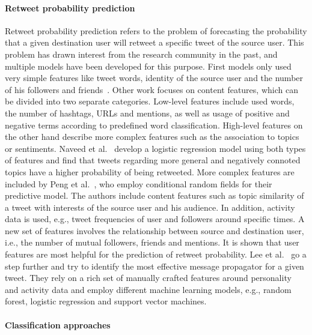 \paragraph{Retweet probability prediction}

Retweet probability prediction refers to the problem of forecasting the
probability that a given destination user will retweet a specific tweet of
the source user.
This problem has drawn interest from the research community in the past, and
multiple models have been developed for this purpose.
First models only used very simple features like tweet words, identity of the
source user and the number of his followers and friends~\cite{Zaman2010}.
Other work focuses on content features, which can be divided into two separate
categories.
Low-level features include used words, the number of hashtags, URLs and mentions,
as well as usage of positive and negative terms according to predefined word 
classification.
High-level features on the other hand describe more complex features such as
the association to topics or sentiments.
Naveed et al.~\cite{Naveed2011} develop a logistic regression model using
both types of features and find that tweets regarding more general and 
negatively connoted topics have a higher probability of being retweeted.
More complex features are included by Peng et al.~\cite{Peng2011},
who employ conditional random fields for their predictive model.
The authors include content features such as topic similarity of a tweet with 
interests of the source user and his audience.
In addition, activity data is used, e.g., tweet frequencies of user and
followers around specific times.
A new set of features involves the relationship between source and destination
user, i.e., the number of mutual followers, friends and mentions.
It is shown that user features are most helpful for the prediction of
retweet probability.
Lee et al.~\cite{Lee2014} go a step further and try to identify the most
effective message propagator for a given tweet.
They rely on a rich set of manually crafted features around personality and activity data
and employ different machine learning models, e.g., random forest, logistic
regression and support vector machines.

\paragraph{Classification approaches}

